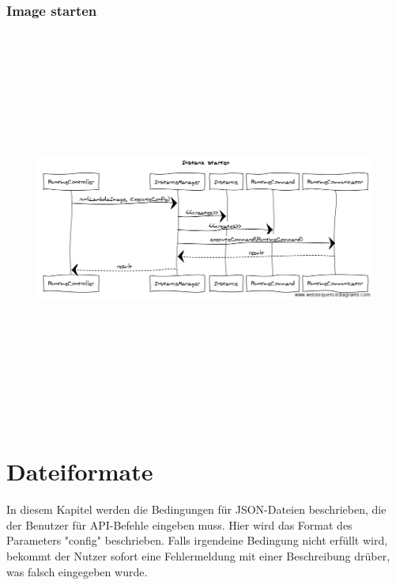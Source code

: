 \documentclass[a4paper,20pt,oneside]{book}
\begin{document}
\subsection{Image starten}
	\begin{figure}[!hb]
    \includegraphics[width=18cm,height=13cm]{startInstance}
\end{figure}
\newpage
\newpage	
	
	\chapter{Dateiformate}
	In diesem Kapitel werden die Bedingungen für JSON-Dateien beschrieben, die der Benutzer für API-Befehle eingeben muss. Hier wird das Format des Parameters "config" beschrieben. Falls irgendeine Bedingung nicht erfüllt wird, bekommt der Nutzer sofort eine Fehlermeldung mit einer Beschreibung drüber, was falsch eingegeben wurde.
\end{document}
